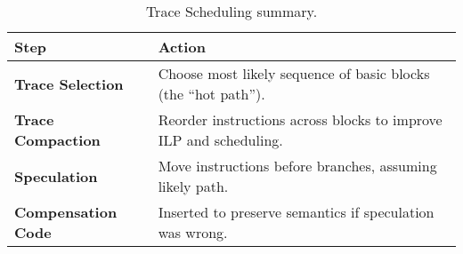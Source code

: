\begin{table}[!htp]
    \centering
    \begin{tabular}{@{} l p{23em} @{}}
        \toprule
        Step & Action \\
        \midrule
        \textbf{Trace Selection}    & Choose most likely sequence of basic blocks (the ``hot path'').   \\ [.5em]
        \textbf{Trace Compaction}   & Reorder instructions across blocks to improve ILP and scheduling. \\ [.5em]
        \textbf{Speculation}        & Move instructions before branches, assuming likely path.          \\ [.5em]
        \textbf{Compensation Code}  & Inserted to preserve semantics if speculation was wrong.          \\
        \bottomrule
    \end{tabular}
    \caption{Trace Scheduling summary.}
\end{table}